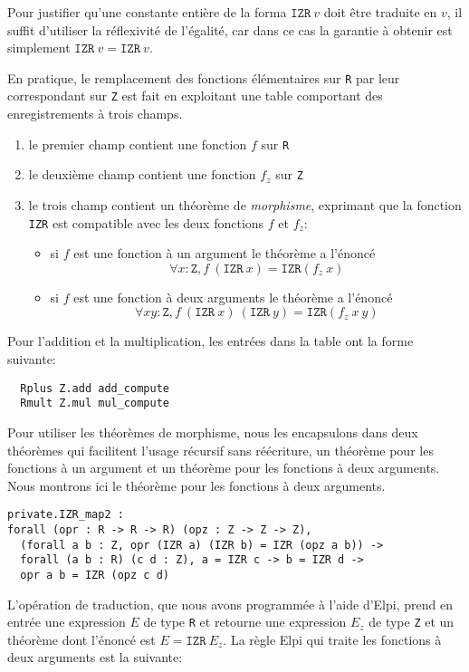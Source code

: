 \documentclass{modjflart}
\begin{document}
Pour justifier qu'une constante entière de la forma \(\texttt{IZR}~v\)
doit être traduite en \(v\), il suffit d'utiliser la réflexivité de
l'égalité, car dans ce cas la garantie à obtenir est simplement
\(\texttt{IZR}~v = \texttt{IZR}~v\).

En pratique, le remplacement des fonctions élémentaires sur \texttt{R} par
leur correspondant sur \texttt{Z} est fait en exploitant une table
comportant des enregistrements à trois champs.
\begin{enumerate}
\item le premier champ contient une fonction \(f\) sur \texttt{R}
\item le deuxième champ contient une fonction \(f_z\) sur \texttt{Z}
\item le trois champ contient un théorème de {\em morphisme},
  exprimant que la fonction \texttt{IZR} est compatible avec les deux
  fonctions \(f\) et \(f_z\):
\begin{itemize}
\item si \(f\) est une fonction à un argument le théorème a l'énoncé
\[\forall x : \texttt{Z}, f~(\texttt{IZR}~x)=\texttt{IZR}(f_z~x)\]
\item si \(f\) est une fonction à deux arguments le théorème a l'énoncé
\[\forall x y : \texttt{Z}, f~(\texttt{IZR}~x)~(\texttt{IZR}~y)=\texttt{IZR}(f_z~x~y)\]
\end{itemize}
\end{enumerate}

Pour l'addition et la multiplication, les entrées dans la table ont
 la forme suivante:
\begin{verbatim}
  Rplus Z.add add_compute
  Rmult Z.mul mul_compute
\end{verbatim}

Pour utiliser les théorèmes de morphisme, nous les encapsulons dans deux
théorèmes qui facilitent l'usage récursif sans réécriture, un théorème
pour les fonctions à un argument et un théorème pour les fonctions à deux
arguments.  Nous montrons ici le théorème pour les fonctions à deux arguments.

\begin{verbatim}
private.IZR_map2 :
forall (opr : R -> R -> R) (opz : Z -> Z -> Z),
  (forall a b : Z, opr (IZR a) (IZR b) = IZR (opz a b)) ->
  forall (a b : R) (c d : Z), a = IZR c -> b = IZR d ->
  opr a b = IZR (opz c d)
\end{verbatim}

L'opération de traduction, que nous avons programmée à l'aide d'Elpi,
prend en entrée une expression \(E\) de type \texttt{R} et retourne une
expression \(E_z\) de type \texttt{Z} et un théorème dont l'énoncé est
\(E = \texttt{IZR}~E_z\).  La règle Elpi qui traite les fonctions à deux
arguments est la suivante:
\end{document}

